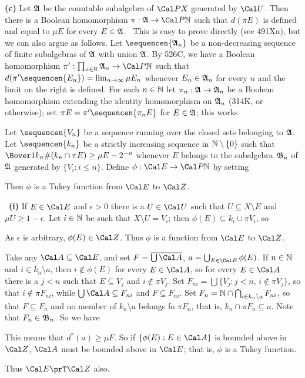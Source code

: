 {{\bf (c)} Let $\frak A$ be the countable subalgebra of $\Cal PX$
generated by $\Cal U$.   Then there is a Boolean homomorphism
$\pi:\frak A\to\Cal P\Bbb N$ such that $d(\pi E)$ is defined
and equal to $\mu E$ for every $E\in\frak A$.   \Prf\ This is easy to
prove directly (see 491Xu), but we can also argue as follows.
Let $\sequencen{\frak A_n}$ be a non-decreasing
sequence of finite subalgebras
of $\frak A$ with union $\frak A$.   By 526C, we have a Boolean
homomorphism $\pi':\prod_{n\in\Bbb N}\frak A_n\to\Cal P\Bbb N$ such that
$d(\pi'\sequencen{E_n})=\lim_{n\to\infty}\mu E_n$ whenever
$E_n\in\frak A_n$ for every $n$ and the limit on the right is defined.
For each $n\in\Bbb N$ let $\pi_n:\frak A\to\frak A_n$ be a Boolean
homomorphism extending the identity
homomorphism on $\frak A_n$ (314K, or otherwise);  set
$\pi E=\pi'\sequencen{\pi_nE}$ for $E\in\frak A$;  this works.\ \Qed

Let $\sequencen{V_n}$ be a sequence running over the closed sets
belonging to $\frak A$.
Let $\sequencen{k_n}$ be a strictly increasing sequence in $\Bbb
N\setminus\{0\}$ such that $\Bover1{k_n}\#(k_n\cap\pi E)\ge\mu E-2^{-n}$
whenever $E$ belongs to the subalgebra $\frak B_n$ of
$\frak A$ generated by $\{V_i:i\le n\}$.   Define
$\phi:\Cal E\to\Cal P\Bbb N$ by setting


\noindent Then $\phi$ is a Tukey function from $\Cal E$ to $\Cal Z$.

\medskip

\Prf\ {\bf (i)} If $E\in\Cal E$ and $\epsilon>0$ there is a $U\in\Cal U$
such that $U\subseteq X\setminus E$ and $\mu U\ge 1-\epsilon$.
Let $i\in\Bbb N$ be such that $X\setminus U=V_i$;  then
$\phi(E)\subseteq k_i\cup\pi V_i$, so


\noindent As $\epsilon$ is arbitrary, $\phi(E)\in\Cal Z$.   Thus $\phi$
is a function from $\Cal E$ to $\Cal Z$.

\medskip

 Take any $\Cal A\subseteq\Cal E$, and set
$F=\overline{\bigcup\Cal A}$, $a=\bigcup_{E\in\Cal E}\phi(E)$.
If $n\in\Bbb N$ and $i\in k_n\setminus a$, then $i\notin\phi(E)$ for
every $E\in\Cal A$, so for every $E\in\Cal A$ there is a $j<n$ such
that $E\subseteq V_j$ and $i\notin\pi V_j$.
Set $F_{ni}=\bigcup\{V_j:j<n$, $i\notin\pi V_j\}$, so that $i\notin\pi
F_{ni}$, while $\bigcup\Cal A\subseteq F_{ni}$ and $F\subseteq F_{ni}$.
Set $F_n=\Bbb N\cap\bigcap_{i\in k_n\setminus a}F_{ni}$,
so that $F\subseteq F_n$
and no member of $k_n\setminus a$ belongs fo $\pi F_n$, that is,
$k_n\cap\pi F_n\subseteq a$.   Note that
$F_n\in\frak B_n$.   So we have


\noindent This means that $d^*(a)\ge\mu F$.   So if $\{\phi(E):E\in\Cal
A\}$ is bounded above in $\Cal Z$, $\Cal A$ must be bounded above in
$\Cal E$;  that is, $\phi$ is a
Tukey function.\ \Qed

Thus $\Cal E\prT\Cal Z$ also.
}%

